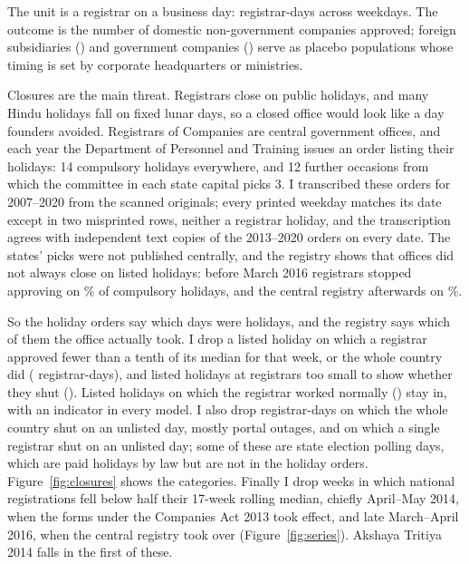 \documentclass[12pt,letterpaper]{article}
\begin{document}
The unit is a registrar on a business day: \NRocDays{} registrar-days across \NBusinessDays{} weekdays. The outcome is the number of domestic non-government companies approved; foreign subsidiaries (\NForeign) and government companies (\NGovt) serve as placebo populations whose timing is set by corporate headquarters or ministries.

Closures are the main threat. Registrars close on public holidays, and many Hindu holidays fall on fixed lunar days, so a closed office would look like a day founders avoided. Registrars of Companies are central government offices, and each year the Department of Personnel and Training issues an order listing their holidays: 14 compulsory holidays everywhere, and 12 further occasions from which the committee in each state capital picks 3. I transcribed these orders for 2007--2020 from the scanned originals; every printed weekday matches its date except in two misprinted rows, neither a registrar holiday, and the transcription agrees with independent text copies of the 2013--2020 orders on every date. The states' picks were not published centrally, and the registry shows that offices did not always close on listed holidays: before March 2016 registrars stopped approving on \ShareCompulsoryShutPre\% of compulsory holidays, and the central registry afterwards on \ShareCompulsoryShutPost\%.

So the holiday orders say which days were holidays, and the registry says which of them the office actually took. I drop a listed holiday on which a registrar approved fewer than a tenth of its median for that week, or the whole country did (\NHolidayClosed{} registrar-days), and listed holidays at registrars too small to show whether they shut (\NHolidayUndetectable). Listed holidays on which the registrar worked normally (\NHolidayOpen) stay in, with an indicator in every model. I also drop \NNationalShut{} registrar-days on which the whole country shut on an unlisted day, mostly portal outages, and \NUnexplainedShut{} on which a single registrar shut on an unlisted day; some of these are state election polling days, which are paid holidays by law but are not in the holiday orders. Figure~\ref{fig:closures} shows the categories. Finally I drop \NDisruptedWeeks{} weeks in which national registrations fell below half their 17-week rolling median, chiefly April--May 2014, when the forms under the Companies Act 2013 took effect, and late March--April 2016, when the central registry took over (Figure~\ref{fig:series}). Akshaya Tritiya 2014 falls in the first of these.
\end{document}
